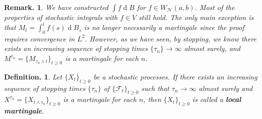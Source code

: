 \documentclass[11pt, a4paper]{memoir}
\theoremstyle{change}
\theoremstyle{plain}
\theoremstyle{nonumberplain}
\newtheorem{definition}{Definition.}
\newtheorem{remark}{Remark.}
\renewcommand{\d}[1]{\ensuremath{\operatorname{d}\!{#1}}}
\newcommand{\defn}[1]{{\boldmath\bfseries #1}}
\numberwithin{equation}{section}
\begin{document}
\begin{remark}
    We have constructed $\int f\d{B}$ for $f\in W_{\mathcal{H}}(a,b)$.
    Most of the properties of stochastic integrals with $f\in V$ still hold.
    The only main exception is that $M_t=\int_0^tf(s)\d{B_s}$ is no longer necessarily a martingale since the proof requires convergence in $L^2$.
    However, as we have seen, by stopping, we know there exists an increasing sequence of stopping times $\{\tau_n\}\to\infty$ almost surely, and $M^{\tau_n}=\{M_{\tau_n\wedge t}\}_{t\geq 0}$ is a martingale for each $n$.
\end{remark}
\begin{definition}
    Let $\{X_t\}_{t\geq 0}$ be a stochastic processes.
    If there exists an increasing sequence of stopping times $\{\tau_n\}$ of $\{\mathcal{F}_t\}_{t\ge 0}$ such that $\tau_n\to\infty$ almost surely and $X^{\tau_n}=\{X_{t\wedge\tau_n}\}_{t\geq 0}$ is a martingale for each $n$, then $\{X_t\}_{t\geq 0}$ is called a \defn{local martingale}.
\end{definition}
\end{document}

